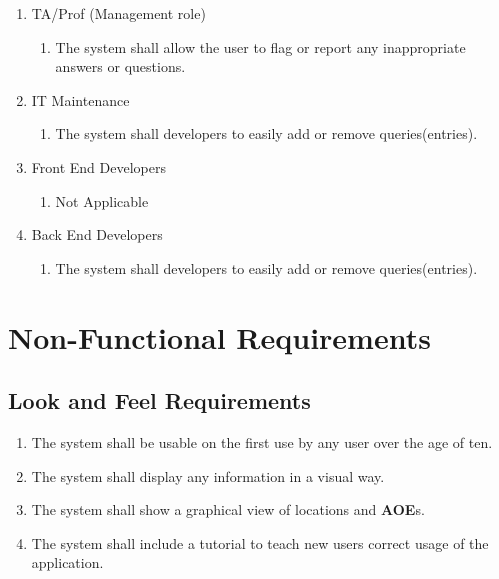 \documentclass[titlepage]{article}
\begin{document}
\begin{enumerate}[\textbf{{BE}1.}]
\begin{enumerate}[\textbf{{VP6}.1}]
		\item TA/Prof (Management role)
			\begin{enumerate}
				\item The system shall allow the user to flag or report any inappropriate answers or questions.
			\end{enumerate}
		
		\item IT Maintenance
			\begin{enumerate}
				\item The system shall developers to easily add or remove queries(entries).
			\end{enumerate}
		
		\item Front End Developers
			\begin{enumerate}
				\item Not Applicable
			\end{enumerate}
			
		\item Back End Developers
			\begin{enumerate}
				\item The system shall developers to easily add or remove queries(entries).
			\end{enumerate}
	\end{enumerate}
		
\end{enumerate}

\section{Non-Functional Requirements}
\label{sec:non-functional_requirements}


\subsection{Look and Feel Requirements}
\label{sub:look_and_feel_requirements}
\begin{enumerate}
\item
The system shall be usable on the first use by any user over the age of ten.
\item
The system shall display any information in a visual way. %
\item
The system shall show a graphical view of locations and \textbf{AOE}s.
\item
The system shall include a tutorial to teach new users correct usage of the application.
\end{enumerate}
\end{document}
